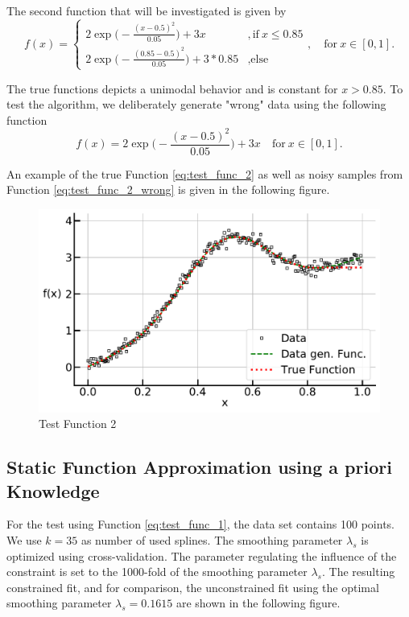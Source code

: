 \documentclass[10pt,a4paper]{article}
\begin{document}
The second function that will be investigated is given by
\begin{equation} \label{eq:test_func_2}
f(x) = \begin{cases}
2\exp \big(-\frac{(x-0.5)^2}{0.05} \big) + 3x  &,\text{if} \ x \le 0.85 \\
2\exp \big(-\frac{(0.85-0.5)^2}{0.05} \big) + 3*0.85  &,\text{else}
\end{cases}, \quad \text{for} \ x \in [0,1]. 	
\end{equation}

The true functions depicts a unimodal behavior and is constant for $x > 0.85$. To test the algorithm, we deliberately generate "wrong" data using the following function
\begin{equation} \label{eq:test_func_2_wrong}
	f(x) = 2\exp \big(-\frac{(x-0.5)^2}{0.05} \big) + 3x  \quad \text{for} \ x \in [0, 1]. 
\end{equation}

An example of the true Function \ref{eq:test_func_2} as well as noisy samples from Function \ref{eq:test_func_2_wrong} is given in the following figure.

\begin{figure}[H]
	\centering
	\includegraphics[width=\columnwidth]{../thesisplots/exp_peak_data.pdf}
	\caption{Test Function 2}
	\label{fig:test_func_2}
\end{figure}

\subsection{Static Function Approximation using a priori Knowledge}

For the test using Function \ref{eq:test_func_1}, the data set contains 100 points. We use $k=35$ as number of used splines. The smoothing parameter $\lambda_s$ is optimized using cross-validation. The parameter regulating the influence of the constraint is set to the 1000-fold of the smoothing parameter $\lambda_s$. The resulting constrained fit, and for comparison, the unconstrained fit using the optimal smoothing parameter $\lambda_s = 0.1615$ are shown in the following figure.
\end{document}
